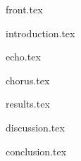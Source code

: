 
\frontmatter

{front.tex}

{introduction.tex}

\tableofcontents*

\mainmatter

{echo.tex}

{chorus.tex}

{results.tex}

{discussion.tex}

{conclusion.tex}

\backmatter

\printbibliography
